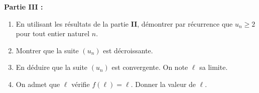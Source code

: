 \textbf{Partie III :}

\begin{enumerate}
	\item En utilisant les résultats de la partie \textbf{II}, démontrer par récurrence que $u_n \geqslant  2$ pour tout entier naturel $n$.
	\item Montrer que la suite $\left(u_n\right)$ est décroissante.
	\item En déduire que la suite $\left(u_n\right)$ est convergente. On note $\ell$ sa limite.
	\item On admet que $\ell$ vérifie $f(\ell) = \ell$. Donner la valeur de $\ell$.
\end{enumerate}